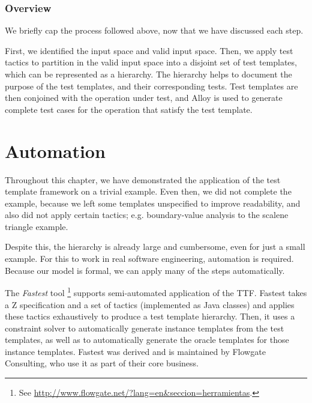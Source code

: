 \begin{comment}
By applying the hiding operator, the final oracle template is:

\begin{tabular}{lll}
 & \verb+OT1_PERM_SCA.xyz == [class : Triangle | class = SCA]+
\end{tabular}

Therefore, by conjoining the original operation and the instance template, then solving the predicate and hiding the input variables, we end up with a template that describes the expected output.
\end{example}
\end{comment}

\subsubsection{Overview}

We briefly cap the process followed above, now that we have discussed each step.

First, we identified the input space and valid input space. Then, we apply test tactics to partition in the valid input space into a disjoint set of test templates, which can be represented as a hierarchy. The hierarchy helps to document the purpose of the test templates, and their corresponding tests. Test templates are then conjoined with the operation under test, and Alloy is used to generate complete test cases for the operation that satisfy the test template.


\section{Automation}

Throughout this chapter, we have demonstrated the application of the test template framework on a trivial example. Even then, we did not complete the example, because we left some templates unspecified to improve readability, and also did not apply certain tactics; e.g. boundary-value analysis to the scalene triangle example. 

Despite this, the hierarchy is already large and cumbersome, even for just a small example. For this to work in real software engineering, automation is required. Because our model is formal, we can apply many of the steps automatically.

The \emph{Fastest} tool \footnote{See \url{http://www.flowgate.net/?lang=en&seccion=herramientas}.} supports semi-automated application of the TTF. Fastest takes a Z specification and a set of tactics (implemented as Java classes) and applies these tactics exhaustively to produce a test template hierarchy. Then, it uses a constraint solver to automatically generate instance templates from the test templates, as well as to automatically generate the oracle templates for those instance templates. Fastest was derived and is maintained by Flowgate Consulting, who use it as part of their core business.


